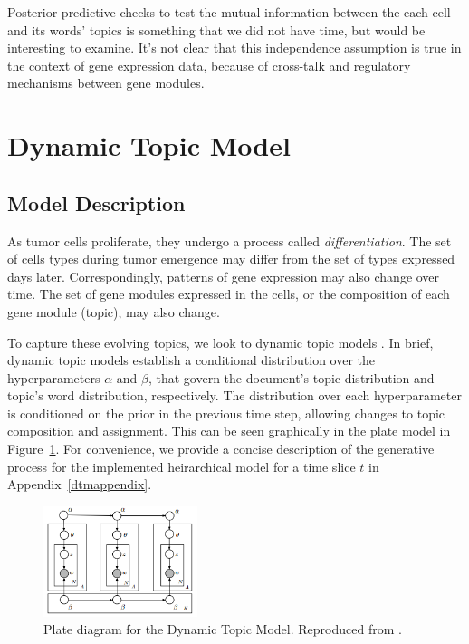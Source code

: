 \documentclass{article}
\begin{document}
Posterior predictive checks to test the mutual information between the each cell and its words' topics is something that we did not have time, but would be interesting to examine. It's not clear that this independence assumption is true in the context of gene expression data, because of cross-talk and regulatory mechanisms between gene modules.

\section{Dynamic Topic Model} 
\label{dtmsec}
\subsection{Model Description} 
As tumor cells proliferate, they undergo a process called \textit{differentiation}. The set of cells types during tumor emergence may differ from the set of types expressed days later. Correspondingly, patterns of gene expression may also change over time. The set of gene modules expressed in the cells, or the composition of each gene module (topic), may also change.

To capture these evolving topics, we look to dynamic topic models \cite{dtm}. In brief, dynamic topic models establish a conditional distribution over the hyperparameters $\alpha$ and $\beta$, that govern the document's topic distribution and topic's word distribution, respectively. The distribution over each hyperparameter is conditioned on the prior in the previous time step, allowing changes to topic composition and assignment. This can be seen graphically in the plate
model in Figure~\ref{fig:dtmplate}. For convenience, we provide a concise description of the generative process for the implemented heirarchical model for a time slice $t$ in Appendix~\ref{dtmappendix}.

\begin{figure}[h]
    \vspace{-0.1in}
    \centering
    \includegraphics[width=0.4\textwidth]{figs/dtmplate}
    \caption{Plate diagram for the Dynamic Topic Model. Reproduced from \cite{dtm}.}
    \label{fig:dtmplate}
    \vspace{-0.1in}
\end{figure}
\end{document}
